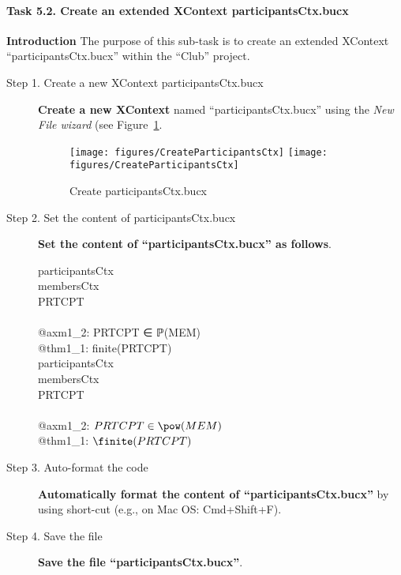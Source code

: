 \paragraph{Task 5.2. Create an extended XContext participantsCtx.bucx}
\textbf{Introduction} The purpose of this sub-task is to create an extended XContext ``participantsCtx.bucx'' within the ``Club'' project.

\begin{description}
\item[Step 1. Create a new XContext participantsCtx.bucx] \textbf{Create a new XContext} named ``participantsCtx.bucx'' using the \emph{New File wizard} (see Figure~\ref{fig:CreateParticipantsCtx}.
  \begin{figure}[!htbp]
    \centering
    \texttt{[image: figures/CreateParticipantsCtx]}
    \else
    \texttt{[image: figures/CreateParticipantsCtx]}
    \endif
    \caption{Create participantsCtx.bucx}
    \label{fig:CreateParticipantsCtx}
  \end{figure}

\item[Step 2. Set the content of participantsCtx.bucx] \textbf{Set the content of ``participantsCtx.bucx'' as follows}.
  \begin{center}
    \begin{Bcode}
      \Bcontext{} participantsCtx\\
      \Bextends{} membersCtx\\
      \Bconstants{} PRTCPT\\
      \Baxioms\\
      @axm1_2: PRTCPT ∈ ℙ(MEM)\\
      \Btheorem{} @thm1_1: finite(PRTCPT)\\
      \Bend
      \else
      \Bcontext{} participantsCtx\\
      \Bextends{} membersCtx\\
      \Bconstants{} PRTCPT\\
      \Baxioms\\
      \Btab @axm1_2: \(PRTCPT \in \pow(MEM)\)\\
      \Btab \Btheorem{} @thm1_1: \(\finite(PRTCPT)\)\\
      \Bend
      \endif
    \end{Bcode}
  \end{center}

\item[Step 3. Auto-format the code] \textbf{Automatically format the content of ``participantsCtx.bucx''} by using short-cut (e.g., on Mac OS: Cmd+Shift+F).

\item[Step 4. Save the file] \textbf{Save the file ``participantsCtx.bucx''}.
\end{description}

